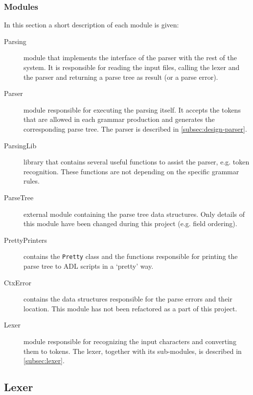   \subsubsection{Modules}
  \label{subsec:parser-modules}
  In this section a short description of each module is given:
  \begin{description}
    \item[Parsing] module that implements the interface of the parser with the rest of the system.
      It is responsible for reading the input files, calling the lexer and the parser and returning a parse tree as result (or a parse error).

    \item[Parser] module responsible for executing the parsing itself.
      It accepts the tokens that are allowed in each grammar production and generates the corresponding parse tree.
      The parser is described in \autoref{subsec:design-parser}.
      
    \item[ParsingLib] library that contains several useful functions to assist the parser, e.g. token recognition.
      These functions are not depending on the specific grammar rules.
      
    \item[ParseTree] external module containing the parse tree data structures.
      Only details of this module have been changed during this project (e.g. field ordering).
    
    \item[PrettyPrinters] contains the \texttt{Pretty} class and the functions responsible for printing the parse tree to ADL scripts in a `pretty' way.
    
    \item[CtxError] contains the data structures responsible for the parse errors and their location.
      This module has not been refactored as a part of this project.
    
    \item[Lexer] module responsible for recognizing the input characters and converting them to tokens.
      The lexer, together with its sub-modules, is described in \autoref{subsec:lexer}.
  \end{description}

\subsection{Lexer}
\label{subsec:lexer}

